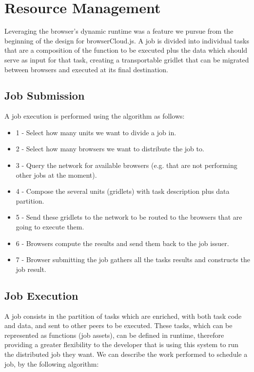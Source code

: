 \section{Resource Management}

Leveraging the browser's dynamic runtime was a feature we pursue from the beginning of the design for browserCloud.js. A job is divided into individual tasks that are a composition of the function to be executed plus the data which should serve as input for that task, creating a transportable gridlet that can be migrated between browsers and executed at its final destination.

\subsection{Job Submission}

A job execution is performed using the algorithm as follows:

\begin{itemize}
    \item 1 - Select how many units we want to divide a job in.
    \item 2 - Select how many browsers we want to distribute the job to.
    \item 3 - Query the network for available browsers (e.g. that are not performing other jobs at the moment).
    \item 4 - Compose the several units (gridlets) with task description plus data partition.
    \item 5 - Send these gridlets to the network to be routed to the browsers that are going to execute them.
    \item 6 - Browsers compute the results and send them back to the job issuer.
    \item 7 - Browser submitting the job gathers all the tasks results and constructs the job result.
\end{itemize}

\subsection{Job Execution}

A job consists in the partition of tasks which are enriched, with both task code and data, and sent to other peers to be executed. These tasks, which can be represented as functions (job assets), can be defined in runtime, therefore providing a greater flexibility to the developer that is using this system to run the distributed job they want. We can describe the work performed to schedule a job, by the following algorithm:

